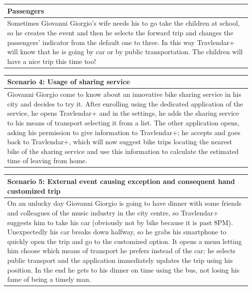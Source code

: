 %
\begin{center}
\def\arraystretch{1.5}
  \begin{tabular}{ | p{} | }
    \hline
    Passengers \\ \hline
    Sometimes Giovanni Giorgio's wife needs his to go take the children at school, so he creates the event and then he selects the forward trip and changes the passengers’ indicator from the default one to three. In this way Travlendar+ will know that he is going by car or by public transportation. The children will have a nice trip this time too! \\ \hline
  \end{tabular}
\end{center}
%
\begin{center}
\def\arraystretch{1.5}
  \begin{tabular}{ | p{} | }
    \hline
    Scenario 4: Usage of sharing service \\ \hline
    Giovanni Giorgio come to know about an innovative bike sharing service in his city and decides to try it. After enrolling using the dedicated application of the service, he opens Travlendar+ and in the settings, he adds the sharing service to his means of transport selecting it from a list. The other application opens, asking his permission to give information to Travlendar+; he accepts and goes back to Travlendar+, which will now suggest bike trips locating the nearest bike of the sharing service and use this information to calculate the estimated time of leaving from home. \\ \hline
  \end{tabular}
\end{center}
%
\begin{center}
\def\arraystretch{1.5}
  \begin{tabular}{ | p{} | }
    \hline
    Scenario 5: External event causing exception and consequent hand customized trip \\ \hline
    On an unlucky day Giovanni Giorgio is going to have dinner with some friends and colleagues of the music industry in the city centre, so Travlendar+ suggests him to take his car (obviously not by bike because it is past 8PM). Unexpectedly his car breaks down halfway, so he grabs his smartphone to quickly open the trip and go to the customized option. It opens a menu letting him choose which means of transport he prefers instead of the car; he selects public transport and the application immediately updates the trip using his position. In the end he gets to his dinner on time using the bus, not losing his fame of being a timely man.  \\ \hline
  \end{tabular}
\end{center}

